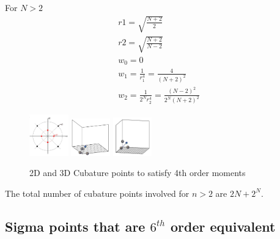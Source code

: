 \documentclass[letterpaper, 10 pt, conference]{ieeeconf}  %
\begin{document}
For $N>2$
\setlength{\arraycolsep}{0.0em}
\begin{eqnarray}
r1=\sqrt{\frac{N+2}{2}}\\
r2=\sqrt{\frac{N+2}{N-2}}\\
w_0=0\\
w_1=\frac{1}{r_1^4}=\frac{4}{(N+2)^2}\\
w_2=\frac{1}{2^Nr_2^4}=\frac{(N-2)^2}{2^N(N+2)^2}
\end{eqnarray}
\setlength{\arraycolsep}{5pt} 

   \begin{figure}[thpb]
      \centering
      \includegraphics[width=0.15\textwidth]{4thmoment2d1}
      \includegraphics[width=0.15\textwidth]{4thmoment3d1}
      \includegraphics[width=0.15\textwidth]{4thmoment3d3}
      \caption{2D and 3D Cubature points to satisfy 4th order moments}
      \label{fig:23d4m1}
   \end{figure}
The total number of cubature points involved for $n>2$ are $2N+2^N$. 


\subsection{Sigma points that are $6^{th}$ order equivalent}
\end{document}
